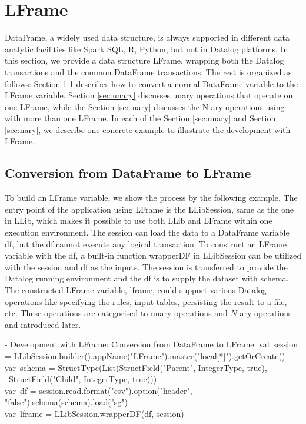 \eldl



\section{LFrame}
\label{lframe}
DataFrame, a widely used data structure, is always supported in different data analytic facilities like Spark SQL, R, Python, but not in Datalog platforms. In this section, we provide a data structure LFrame, wrapping both the Datalog transactions and the common DataFrame transactions. The rest is organized as follows: Section \ref{sec:utility} describes how to convert a normal DataFrame variable to the LFrame variable. Section  \ref{sec:unary} discusses unary operations that operate on one LFrame, while the Section \ref{sec:nary} discusses the N-ary operations using with more than one  LFrame. In each of the Section \ref{sec:unary} and Section  \ref{sec:nary}, we describe one concrete example to illustrate the development with LFrame.



\subsection{Conversion from DataFrame to LFrame}
\label{sec:utility}
To build an LFrame variable, we show the process by the following example.
The entry point of the application using LFrame is the LLibSession, same as the one in LLib, which makes it possible to use both LLib and LFrame within one execution environment. 
The session can  load the data to a DataFrame variable df, but the df cannot execute any logical transaction. To construct an LFrame variable with the  df, a built-in function wrapperDF in LLibSession can be utilized with the session and df as the inputs. 
The session is transferred to provide the Datalog running environment and the df is to supply the dataset with schema.  
The constructed LFrame variable, lframe, could support various Datalog operations like specifying the rules, input tables, persisting the result to a file, etc. These operations are categorised to unary operations and $N$-ary operations and introduced later.

\vspace{0.5em}
 - Development with LFrame:  Conversion from DataFrame to LFrame.
\bldl
val\ session = LLibSession.builder().appName("LFrame").master("local[*]").getOrCreate() \\
var\ schema = StructType(List(StructField("Parent", IntegerType, true),\\ \ StructField("Child", IntegerType, true)))\\
var\ df = session.read.format("csv").option("header", "false").schema(schema).load("sg")\\
var\ lframe = LLibSession.wrapperDF(df, session)
\eldl

